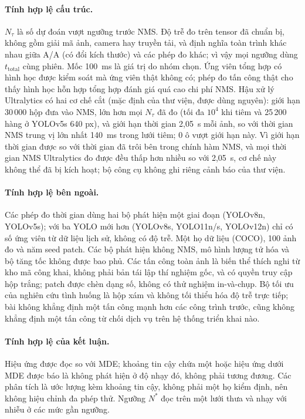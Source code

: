 \documentclass[12pt,a4paper]{article}
\newcommand{\Ntau}{N_{\tau}}
\begin{document}
\paragraph{Tính hợp lệ cấu trúc.}
$\Ntau$ là số dự đoán vượt ngưỡng trước NMS. Độ trễ đo trên tensor đã chuẩn bị, không gồm giải mã ảnh, camera hay truyền tải, và định nghĩa toàn trình khác nhau giữa A/A (có đổi kích thước) và các phép đo khác; vì vậy mọi ngưỡng dùng $t_{\mathrm{total}}$ cùng phiên. Mốc 100~ms là giá trị do nhóm chọn. Ứng viên tổng hợp có hình học được kiểm soát mà ứng viên thật không có; phép đo tấn công thật cho thấy hình học hỗn hợp tổng hợp đánh giá quá cao chi phí NMS. Hậu xử lý Ultralytics có hai cơ chế cắt (mặc định của thư viện, được dùng nguyên): giới hạn 30\,000 hộp đưa vào NMS, lớn hơn mọi $\Ntau$ đã đo (tối đa $10^4$ khi tiêm và 25\,200 hàng ở YOLOv5s 640 px), và giới hạn thời gian 2,05~s mỗi ảnh, so với thời gian NMS trung vị lớn nhất 140~ms trong lưới tiêm; 0 ô vượt giới hạn này. Vì giới hạn thời gian được so với thời gian đã trôi bên trong chính hàm NMS, và mọi thời gian NMS Ultralytics đo được đều thấp hơn nhiều so với 2,05~s, cơ chế này không thể đã bị kích hoạt; bộ công cụ không ghi riêng cảnh báo của thư viện.
\paragraph{Tính hợp lệ bên ngoài.}
Các phép đo thời gian dùng hai bộ phát hiện một giai đoạn (YOLOv8n, YOLOv5s); với ba YOLO mới hơn (YOLOv8s, YOLO11n/s, YOLOv12n) chỉ có số ứng viên từ dữ liệu lịch sử, không có độ trễ. Một họ dữ liệu (COCO), 100 ảnh đo và năm seed patch. Các bộ phát hiện không NMS, mô hình lượng tử hóa và bộ tăng tốc không được bao phủ. Các tấn công toàn ảnh là biến thể thích nghi từ kho mã công khai, không phải bản tái lập thí nghiệm gốc, và có quyền truy cập hộp trắng; patch được chèn dạng số, không có thử nghiệm in-và-chụp. Bộ tối ưu của nghiên cứu tình huống là hộp xám và không tối thiểu hóa độ trễ trực tiếp; bài không khẳng định một tấn công mạnh hơn các công trình trước, cũng không khẳng định một tấn công từ chối dịch vụ trên hệ thống triển khai nào.
\paragraph{Tính hợp lệ của kết luận.}
Hiệu ứng được đọc so với MDE; khoảng tin cậy chứa một hoặc hiệu ứng dưới MDE được báo là không phát hiện ở độ nhạy đó, không phải tương đương. Các phân tích là ước lượng kèm khoảng tin cậy, không phải một họ kiểm định, nên không hiệu chỉnh đa phép thử. Ngưỡng $N^{*}$ đọc trên một lưới thưa và nhạy với nhiễu ở các mức gần ngưỡng.
\end{document}
